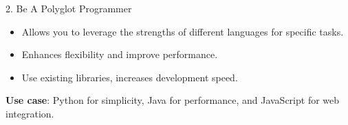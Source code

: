 
\begin{roundedbeamerblock}{2. Be A Polyglot Programmer}
    \vspace{5mm}
    \begin{itemize}
        \item Allows you to leverage the strengths of different languages for specific tasks.
    \vspace{5mm}
        \item Enhances flexibility and improve performance.
    \vspace{5mm}
        \item Use existing libraries, increases development speed.
    \vspace{6mm}
        \end{itemize}
    \textbf{Use case}: Python for simplicity, Java for performance, and JavaScript for web integration.

\end{roundedbeamerblock}
